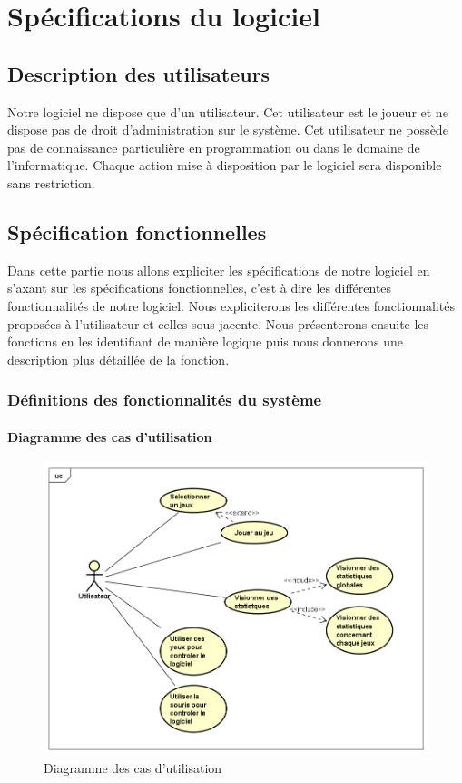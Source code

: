 \documentclass{polytech/polytech}
\begin{document}
\chapter{Spécifications du logiciel}
\section{Description des utilisateurs}
Notre logiciel ne dispose que d'un utilisateur. Cet utilisateur est le joueur et ne dispose pas de droit d'administration sur le système. Cet utilisateur ne possède pas de connaissance particulière en programmation ou dans le domaine de l'informatique. Chaque action mise à disposition par le logiciel sera disponible sans restriction.
\section{Spécification fonctionnelles}
Dans cette partie nous allons expliciter les spécifications de notre logiciel en s'axant sur les spécifications fonctionnelles, c'est à dire les différentes fonctionnalités de notre logiciel. Nous expliciterons les différentes fonctionnalités proposées à l'utilisateur et celles sous-jacente. Nous présenterons ensuite les fonctions en les identifiant de manière logique puis nous donnerons une description plus détaillée de la fonction. 

\subsection{Définitions des fonctionnalités du système}

\subsubsection{Diagramme des cas d'utilisation}

\begin{figure}
    \centering
    \includegraphics[width=13cm]{img/diagrammes/usecase.png}
    \caption{Diagramme des cas d'utilisation}
    \label{fig:use_case}
\end{figure}
\pagebreak
\end{document}
